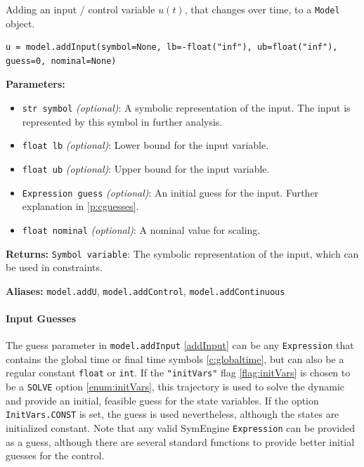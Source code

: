 \documentclass[12pt]{article}
\begin{document}
\begin{mdframed}[backgroundcolor=gray!10, roundcorner=10pt, linewidth=1pt]

	Adding an input / control variable $u(t)$, that changes over time, to a
	\texttt{Model} object.

	\begin{lstlisting}
u = model.addInput(symbol=None, lb=-float("inf"), ub=float("inf"), guess=0, nominal=None)
	\end{lstlisting}
	\label{addInput}
	\textbf{Parameters:}
	\begin{itemize}
		\item \texttt{str symbol} \emph{(optional)}: A symbolic
		      representation of the input. The input is
		      represented by this symbol in
		      further analysis.
		\item \texttt{float lb} \emph{(optional)}: Lower bound for the
		      input variable.
		\item \texttt{float ub} \emph{(optional)}: Upper bound for the
		      input variable.
		\item \texttt{Expression guess} \emph{(optional)}: An initial
		      guess for the input. Further explanation in
		      \eqref{p:cguesses}.
		\item \texttt{float nominal} \emph{(optional)}: A nominal value
		      for scaling.
	\end{itemize}

	\textbf{Returns:}
	\texttt{Symbol variable}: The symbolic representation of the input,
	which can be used in constraints.

	\textbf{Aliases:}  \texttt{model.addU}, \texttt{model.addControl},
	\texttt{model.addContinuous}
\end{mdframed}

\paragraph{Input Guesses}
\label{p:cguesses}
The guess parameter in \texttt{model.addInput} \eqref{addInput} can be
any \texttt{Expression} that contains the global time or final time symbols
\eqref{c:globaltime}, but can also be a regular constant \texttt{float} or
\texttt{int}. If the \texttt{"initVars"} flag \eqref{flag:initVars} is chosen
to be a
\texttt{SOLVE} option \eqref{enum:initVars}, this trajectory is used to
solve the dynamic and provide an initial, feasible guess for the state
variables. If the option \texttt{InitVars.CONST} is set, the guess is used
nevertheless, although the states are initialized constant. Note that any valid
SymEngine \texttt{Expression} can be provided as
a guess, although there are several standard functions to provide better
initial guesses for the control.
\end{document}
